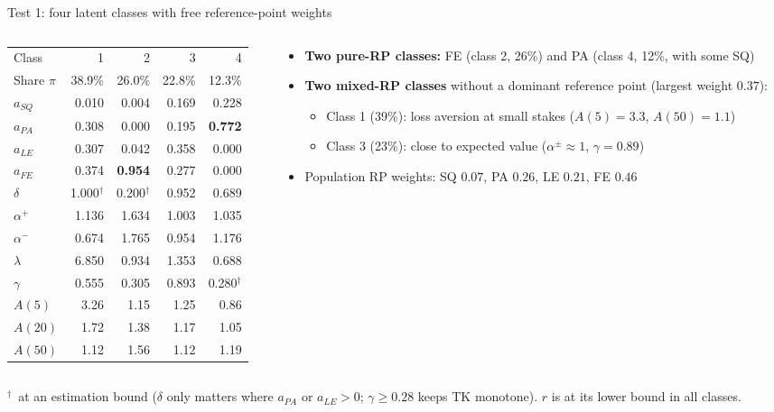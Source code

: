 \documentclass[aspectratio=169,11pt]{beamer}
\newcommand{\ap}{\alpha^{+}}
\newcommand{\am}{\alpha^{-}}
\newcommand{\bd}{\ensuremath{^{\dagger}}}
\newcommand{\tabnote}[1]{\par\vfill{\scriptsize\color{muted}#1\par}}
\newcommand{\tight}{\setlength{\itemsep}{3pt}}
\begin{document}
\begin{frame}{Test 1: four latent classes with free reference-point weights}
\begin{columns}[T,onlytextwidth]
\begin{column}{0.47\textwidth}
\centering\footnotesize\setlength{\tabcolsep}{4pt}
\begin{tabular}{l rrrr}
\toprule
Class & 1 & 2 & 3 & 4\\
Share $\pi$ & 38.9\% & 26.0\% & 22.8\% & 12.3\%\\
\midrule
$a_{SQ}$ & 0.010 & 0.004 & 0.169 & 0.228\\
$a_{PA}$ & 0.308 & 0.000 & 0.195 & \textbf{0.772}\\
$a_{LE}$ & 0.307 & 0.042 & 0.358 & 0.000\\
$a_{FE}$ & 0.374 & \textbf{0.954} & 0.277 & 0.000\\
$\delta$ & 1.000\bd & 0.200\bd & 0.952 & 0.689\\
\midrule
$\ap$ & 1.136 & 1.634 & 1.003 & 1.035\\
$\am$ & 0.674 & 1.765 & 0.954 & 1.176\\
$\lambda$ & 6.850 & 0.934 & 1.353 & 0.688\\
$\gamma$ & 0.555 & 0.305 & 0.893 & 0.280\bd\\
$A(5)$ & 3.26 & 1.15 & 1.25 & 0.86\\
$A(20)$ & 1.72 & 1.38 & 1.17 & 1.05\\
$A(50)$ & 1.12 & 1.56 & 1.12 & 1.19\\
\bottomrule
\end{tabular}
\end{column}
\begin{column}{0.49\textwidth}
\begin{itemize}\small\tight
  \item \textbf{Two pure-RP classes:} FE (class 2, 26\%) and PA (class 4, 12\%, with some SQ)
  \item \textbf{Two mixed-RP classes} without a dominant reference point (largest weight $0.37$):
  \begin{itemize}\footnotesize
    \item Class 1 (39\%): loss aversion at small stakes ($A(5)=3.3$, $A(50)=1.1$)
    \item Class 3 (23\%): close to expected value ($\alpha^{\pm}\approx 1$, $\gamma=0.89$)
  \end{itemize}
  \item Population RP weights: SQ $0.07$, PA $0.26$, LE $0.21$, FE $0.46$
\end{itemize}
\end{column}
\end{columns}
\tabnote{\bd\ at an estimation bound ($\delta$ only matters where $a_{PA}$ or $a_{LE}>0$; $\gamma\ge 0.28$ keeps TK monotone). $r$ is at its lower bound in all classes.}
\end{frame}
\end{document}
